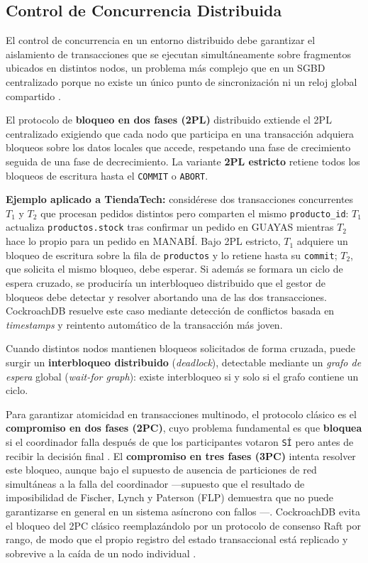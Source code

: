 \documentclass[10pt,letterpaper]{article}
\begin{document}
\subsection{Control de Concurrencia Distribuida}

El control de concurrencia en un entorno distribuido debe garantizar el aislamiento de transacciones que se ejecutan simultáneamente sobre fragmentos ubicados en distintos nodos, un problema más complejo que en un SGBD centralizado porque no existe un único punto de sincronización ni un reloj global compartido \citep{ozsu2020}.

El protocolo de \textbf{bloqueo en dos fases (2PL)} distribuido extiende el 2PL centralizado exigiendo que cada nodo que participa en una transacción adquiera bloqueos sobre los datos locales que accede, respetando una fase de crecimiento seguida de una fase de decrecimiento. La variante \textbf{2PL estricto} retiene todos los bloqueos de escritura hasta el \texttt{COMMIT} o \texttt{ABORT}.

\textbf{Ejemplo aplicado a TiendaTech:} considérese dos transacciones concurrentes $T_1$ y $T_2$ que procesan pedidos distintos pero comparten el mismo \texttt{producto\_id}: $T_1$ actualiza \texttt{productos.stock} tras confirmar un pedido en GUAYAS mientras $T_2$ hace lo propio para un pedido en MANABÍ. Bajo 2PL estricto, $T_1$ adquiere un bloqueo de escritura sobre la fila de \texttt{productos} y lo retiene hasta su \texttt{commit}; $T_2$, que solicita el mismo bloqueo, debe esperar. Si además se formara un ciclo de espera cruzado, se produciría un interbloqueo distribuido que el gestor de bloqueos debe detectar y resolver abortando una de las dos transacciones. CockroachDB resuelve este caso mediante detección de conflictos basada en \textit{timestamps} y reintento automático de la transacción más joven.

Cuando distintos nodos mantienen bloqueos solicitados de forma cruzada, puede surgir un \textbf{interbloqueo distribuido} (\textit{deadlock}), detectable mediante un \textit{grafo de espera} global (\textit{wait-for graph}): existe interbloqueo si y solo si el grafo contiene un ciclo.

Para garantizar atomicidad en transacciones multinodo, el protocolo clásico es el \textbf{compromiso en dos fases (2PC)}, cuyo problema fundamental es que \textbf{bloquea} si el coordinador falla después de que los participantes votaron \texttt{SÍ} pero antes de recibir la decisión final \citep{gray2006consensus}. El \textbf{compromiso en tres fases (3PC)} intenta resolver este bloqueo, aunque bajo el supuesto de ausencia de particiones de red simultáneas a la falla del coordinador —supuesto que el resultado de imposibilidad de Fischer, Lynch y Paterson (FLP) demuestra que no puede garantizarse en general en un sistema asíncrono con fallos \citep{flp1985}—. CockroachDB evita el bloqueo del 2PC clásico reemplazándolo por un protocolo de consenso Raft por rango, de modo que el propio registro del estado transaccional está replicado y sobrevive a la caída de un nodo individual \citep{taft2020cockroachdb,gray2006consensus}.
\end{document}
